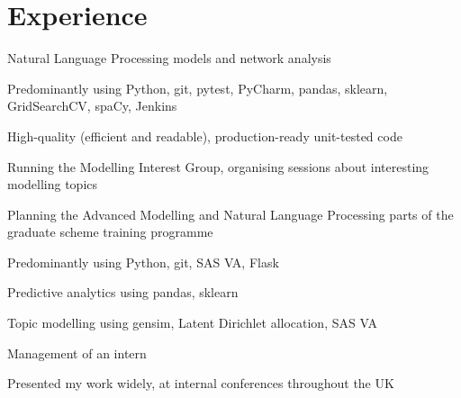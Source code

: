 \documentclass[]{cv-template}
\begin{document}
\begin{minipage}[t]{0.66\textwidth} 


\section{Experience}
\vspace{\topsep} %
\begin{tightemize}
\item Natural Language Processing models and network analysis
\item Predominantly using Python, git, pytest, PyCharm, pandas, sklearn, GridSearchCV, spaCy, Jenkins
\item High-quality (efficient and readable), production-ready unit-tested code
\item Running the Modelling Interest Group, organising sessions about interesting modelling topics
\item Planning the Advanced Modelling and Natural Language Processing parts of the graduate scheme training programme
\end{tightemize}

\sectionsep

\begin{tightemize}
\item Predominantly using Python, git, SAS VA, Flask
\item Predictive analytics using pandas, sklearn
\item Topic modelling using gensim, Latent Dirichlet allocation, SAS VA
\item Management of an intern
\item Presented my work widely, at internal conferences throughout the UK
\end{tightemize}
\sectionsep



\end{minipage}
\end{document}
